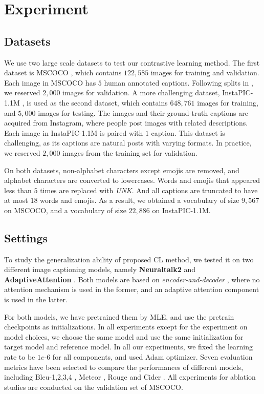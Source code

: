 \section{Experiment}
\label{sec:exprt}


\vspace{-5pt}
\subsection{Datasets}
We use two large scale datasets to test our contrastive learning method.
The first dataset is MSCOCO \cite{lin2014microsoft},
which contains $122,585$ images for training and validation.
Each image in MSCOCO has $5$ human annotated captions.
Following splits in \cite{lu2016knowing},
we reserved $2,000$ images for validation.
A more challenging dataset, InstaPIC-1.1M \cite{park2017attend}, 
is used as the second dataset,
which contains $648,761$ images for training, and $5,000$ images for testing.
The images and their ground-truth captions are acquired from Instagram,
where people post images with related descriptions.
Each image in InstaPIC-1.1M is paired with $1$ caption.
This dataset is challenging, as its captions are natural posts with varying formats.
In practice, we reserved $2,000$ images from the training set for validation.

On both datasets, non-alphabet characters except emojis are removed, 
and alphabet characters are converted to lowercases.
Words and emojis that appeared less than $5$ times are replaced with \emph{UNK}.
And all captions are truncated to have at most $18$ words and emojis.
As a result, we obtained a vocabulary of size $9,567$ on MSCOCO, and a vocabulary of size $22,886$ on InstaPIC-1.1M.

\vspace{-5pt}
\subsection{Settings}

To study the generalization ability of proposed CL method,
we tested it on two different image captioning models,
namely \textbf{Neuraltalk2} \cite{karpathy2015deep} and \textbf{AdaptiveAttention} \cite{lu2016knowing}. 
Both models are based on \emph{encoder-and-decoder} \cite{vinyals2015show},
where no attention mechanism is used in the former,
and an adaptive attention component is used in the latter.

For both models, we have pretrained them by MLE,
and use the pretrain checkpoints as initializations. 
In all experiments except for the experiment on model choices, 
we choose the same model and use the same initialization 
for target model and reference model. 
In all our experiments, 
we fixed the learning rate to be $1e$-$6$ for all components,
and used Adam optimizer. 
Seven evaluation metrics have been selected to compare the performances of different models,
including Bleu-1,2,3,4 \cite{papineni2002bleu}, Meteor \cite{lavie2014meteor}, Rouge \cite{lin2004rouge} and Cider \cite{vedantam2015cider}.
All experiments for ablation studies are conducted on the validation set of MSCOCO.

